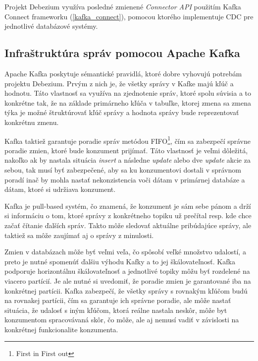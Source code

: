 Projekt Debezium využíva posledné zmienené \textit{Connector API} použitím Kafka Connect frameworku (\ref{kafka_connect}), pomocou ktorého implementuje CDC pre jednotlivé databázové systémy.

\subsection{Infraštruktúra správ pomocou Apache Kafka}
Apache Kafka poskytuje sémantické pravidlá, ktoré dobre vyhovujú potrebám projektu Debezium. Prvým z nich je, že všetky správy v Kafke majú kľúč a hodnotu. Táto vlastnosť sa využíva na zjednotenie správ, ktoré spolu súvisia a to konkrétne tak, že na základe primárneho kľúča v tabuľke, ktorej zmena sa zmena týka je možné štruktúrovať kľúč správy a hodnota správy bude reprezentovať konkrétnu zmenu.

Kafka taktiež garantuje poradie správ metódou FIFO\footnote{First in First out}, čím sa zabezpečí správne poradie zmien, ktoré bude konzument prijímať. Táto vlastnosť je veľmi dôležitá, nakoľko ak by nastala situácia \textit{insert} a následne \textit{update} alebo dve \textit{update} akcie za sebou, tak musí byť zabezpečené, aby sa ku konzumentovi dostali v správnom poradí inač by mohla nastať nekonzistencia voči dátam v primárnej databáze a dátam, ktoré si udržiava konzument.

Kafka je pull-based systém, čo znamená, že konzument je sám sebe pánom a drží si informáciu o tom, ktoré správy z konkrétneho topiku už prečítal resp. kde chce začať čítanie ďalších správ. Takto môže sledovať aktuálne pribúdajúce správy, ale taktiež sa môže zaujímať aj o správy z minulosti.

Zmien v databázach môže byť veľmi veľa, čo spôsobí veľké množstvo udalostí, a preto je nutné spomenúť ďalšiu výhodu Kafky a to jej škálovateľnosť. Kafka podporuje horizontálnu škálovateľnosť a jednotlivé topiky môžu byť rozdelené na viacero partícií. Je ale nutné si uvedomiť, že poradie zmien je garantované iba na konkrétnej partícii. Kafka zabezpečí, že všetky správy s rovnakým kľúčom budú na rovnakej partícii, čím sa garantuje ich správne poradie, ale môže nastať situácia, že udalosť s iným kľúčom, ktorá reálne nastala neskôr, môže byt konzumentom spracovávaná skôr, čo môže, ale aj nemusí vadiť v závislosti na konkrétnej funkcionalite konzumenta.

